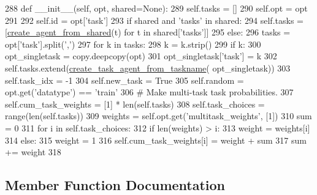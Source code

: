\begin{DoxyCode}
288     \textcolor{keyword}{def }\_\_init\_\_(self, opt, shared=None):
289         self.tasks = []
290         self.opt = opt
291 
292         self.id = opt[\textcolor{stringliteral}{'task'}]
293         \textcolor{keywordflow}{if} shared \textcolor{keywordflow}{and} \textcolor{stringliteral}{'tasks'} \textcolor{keywordflow}{in} shared:
294             self.tasks = [\hyperlink{namespaceparlai_1_1core_1_1agents_aa5af5dd1d2f9da491b60348d479b849f}{create\_agent\_from\_shared}(t) \textcolor{keywordflow}{for} t \textcolor{keywordflow}{in} shared[\textcolor{stringliteral}{'tasks'}]]
295         \textcolor{keywordflow}{else}:
296             tasks = opt[\textcolor{stringliteral}{'task'}].split(\textcolor{stringliteral}{','})
297             \textcolor{keywordflow}{for} k \textcolor{keywordflow}{in} tasks:
298                 k = k.strip()
299                 \textcolor{keywordflow}{if} k:
300                     opt\_singletask = copy.deepcopy(opt)
301                     opt\_singletask[\textcolor{stringliteral}{'task'}] = k
302                     self.tasks.extend(\hyperlink{namespaceparlai_1_1core_1_1agents_ab4473fa54af02b5ab385b41b51dacd10}{create\_task\_agent\_from\_taskname}(
      opt\_singletask))
303         self.task\_idx = -1
304         self.new\_task = \textcolor{keyword}{True}
305         self.random = opt.get(\textcolor{stringliteral}{'datatype'}) == \textcolor{stringliteral}{'train'}
306         \textcolor{comment}{# Make multi-task task probabilities.}
307         self.cum\_task\_weights = [1] * len(self.tasks)
308         self.task\_choices = range(len(self.tasks))
309         weights = self.opt.get(\textcolor{stringliteral}{'multitask\_weights'}, [1])
310         sum = 0
311         \textcolor{keywordflow}{for} i \textcolor{keywordflow}{in} self.task\_choices:
312             \textcolor{keywordflow}{if} len(weights) > i:
313                 weight = weights[i]
314             \textcolor{keywordflow}{else}:
315                 weight = 1
316             self.cum\_task\_weights[i] = weight + sum
317             sum += weight
318 
\end{DoxyCode}


\subsection{Member Function Documentation}
\mbox{\label{classparlai_1_1core_1_1agents_1_1MultiTaskTeacher_a29a2c8f7679aafd2d67b4b0db54d58a3}} 
